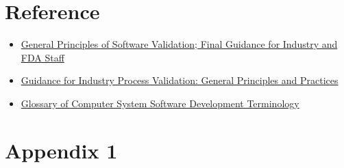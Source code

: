 \documentclass[12pt,a4paper]{article}
\begin{document}
\section{Reference}
\begin{itemize}
\item \href{https://www.fda.gov/media/73141/download}{General Principles of Software Validation; Final Guidance for Industry and FDA Staff}


\item \href{https://www.fda.gov/files/drugs/published/Process-Validation--General-Principles-and-Practices.pdf}{Guidance for Industry Process Validation: General Principles and Practices}


\item \href{https://www.fda.gov/inspections-compliance-enforcement-and-criminal-investigations/inspection-guides/glossary-computer-system-software-development-terminology-895}{Glossary of Computer System Software Development Terminology}

\end{itemize}
\section{Appendix 1}
\end{document}
